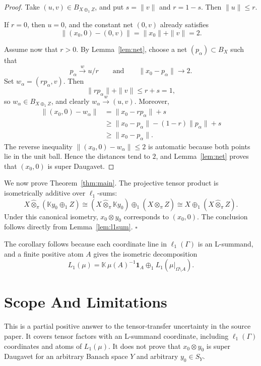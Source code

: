 \documentclass[11pt]{article}
\newcommand{\K}{\mathbb K}
\newcommand{\otpi}{\widehat{\otimes}_{\pi}}
\begin{document}
\begin{proof}
Take \((u,v)\in B_{X\oplus_1 Z}\), and put \(s=\|v\|\) and \(r=1-s\).  Then
\(\|u\|\le r\).

If \(r=0\), then \(u=0\), and the constant net \((0,v)\) already satisfies
\[
   \|(x_0,0)-(0,v)\|=\|x_0\|+\|v\|=2.
\]

Assume now that \(r>0\).  By Lemma~\ref{lem:net}, choose a net
\((p_\alpha)\subset B_X\) such that
\[
   p_\alpha\xrightarrow{w} u/r
   \qquad\text{and}\qquad
   \|x_0-p_\alpha\|\to2.
\]
Set \(w_\alpha=(rp_\alpha,v)\).  Then
\[
   \|rp_\alpha\|+\|v\|\le r+s=1,
\]
so \(w_\alpha\in B_{X\oplus_1 Z}\), and clearly
\(w_\alpha\xrightarrow{w}(u,v)\).
Moreover,
\[
\begin{aligned}
 \|(x_0,0)-w_\alpha\|
   &= \|x_0-rp_\alpha\|+s  \\
   &\ge \|x_0-p_\alpha\|-(1-r)\|p_\alpha\|+s \\
   &\ge \|x_0-p_\alpha\|.
\end{aligned}
\]
The reverse inequality \(\|(x_0,0)-w_\alpha\|\le2\) is automatic because both
points lie in the unit ball.  Hence the distances tend to \(2\), and
Lemma~\ref{lem:net} proves that \((x_0,0)\) is super Daugavet.
\end{proof}

We now prove Theorem~\ref{thm:main}.  The projective tensor product is
isometrically additive over \(\ell_1\)-sums:
\[
  X\otpi(\K y_0\oplus_1 Z)
  \cong (X\otpi \K y_0)\oplus_1(X\otpi Z)
  \cong X\oplus_1(X\otpi Z).
\]
Under this canonical isometry, \(x_0\otimes y_0\) corresponds to
\((x_0,0)\).  The conclusion follows directly from Lemma~\ref{lem:l1sum}.
\(\square\)

The corollary follows because each coordinate line in \(\ell_1(\Gamma)\) is
an L-summand, and a finite positive atom \(A\) gives the isometric
decomposition
\[
   L_1(\mu)
   = \K\,\mu(A)^{-1}\mathbf 1_A
     \oplus_1
     L_1(\mu|_{\Omega\setminus A}).
\]

\section*{Scope And Limitations}

This is a partial positive answer to the tensor-transfer uncertainty in the
source paper.  It covers tensor factors with an L-summand coordinate, including
\(\ell_1(\Gamma)\) coordinates and atoms of \(L_1(\mu)\).  It does not prove
that \(x_0\otimes y_0\) is super Daugavet for an arbitrary Banach space \(Y\)
and arbitrary \(y_0\in S_Y\).
\end{document}
